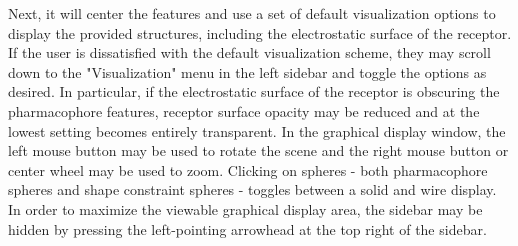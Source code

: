 Next, it will center the features and use a set of default visualization options to display the provided structures, including the electrostatic surface of the receptor. If the user is dissatisfied with the default visualization scheme, they may scroll down to the "Visualization" menu in the left sidebar and toggle the options as desired. In particular, if the electrostatic surface of the receptor is obscuring the pharmacophore features, receptor surface opacity may be reduced and at the lowest setting becomes entirely transparent. In the graphical display window, the left mouse button may be used to rotate the scene and the right mouse button or center wheel may be used to zoom. Clicking on spheres - both pharmacophore spheres and shape constraint spheres - toggles between a solid and wire display. In order to maximize the viewable graphical display area, the sidebar may be hidden by pressing the left-pointing arrowhead at the top right of the sidebar.